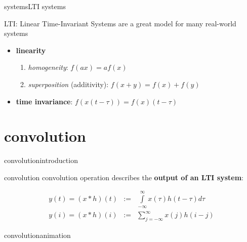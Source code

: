         \begin{frame}{systems}{LTI systems}
            \begin{block}{LTI: Linear Time-Invariant Systems}
                are a great model for many real-world systems
            \end{block}
            
            \bigskip
            \begin{itemize}
                \item   \textbf{linearity}
                   \begin{enumerate}
                        \item   \textit{homogeneity}:
                            $f(ax) = a f(x)$
                        \smallskip
                        \item   \textit{superposition} (additivity):
                        $f(x+y) = f(x) + f(y)$
                    \end{enumerate}
                 \bigskip
                \item   \textbf{time invariance}:
                    $f\left(x(t-\tau)\right) = f(x)(t-\tau)$
             \end{itemize}
        \end{frame}
     
    \section[convolution]{convolution}
        \begin{frame}{convolution}{introduction}
                \begin{block}{convolution}
                    convolution operation describes the \textbf{output of an LTI system}:
                \end{block}
                
            \bigskip
            \begin{eqnarray*}
                y(t) = (x \ast h)(t) &:=& \int\limits_{-\infty}^{\infty}x(\tau)h(t-\tau)d\tau\\
                y(i) = (x \ast h)(i) &:=& \sum\limits_{j=-\infty}^{\infty}x(j)h(i-j)
            \end{eqnarray*}
        \end{frame}
            
        \begin{frame}{convolution}{animation}
            \vspace{-5mm}
            \begin{center}
            \end{center}
        \end{frame}

